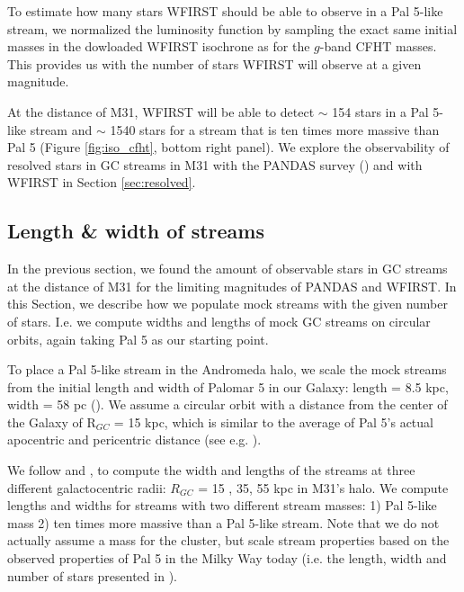 \documentclass[twocolumn]{aastex62}
\begin{document}
To estimate how many stars WFIRST should be able to observe in a Pal 5-like stream, we normalized the luminosity function by sampling the exact same initial masses in the dowloaded WFIRST isochrone as for the $g$-band CFHT masses. This provides us with the number of stars WFIRST will observe at a given magnitude. 

At the distance of M31, WFIRST will be able to detect $\sim$ 154 stars in a Pal 5-like stream and $\sim$ 1540 stars for a stream that is ten times more massive than Pal 5 (Figure \ref{fig:iso_cfht}, bottom right panel). We explore the observability of resolved stars in GC streams in M31 with the PANDAS survey (\citealt{mcconnachie09}) and with WFIRST in Section \ref{sec:resolved}. 




\subsection{Length \& width of streams}
\label{sec:length}
In the previous section, we found the amount of observable stars in GC streams at the distance of M31 for the limiting magnitudes of PANDAS and WFIRST. In this Section, we describe how we populate mock streams with the given number of stars. I.e. we compute widths and lengths of mock GC streams on circular orbits, again taking Pal 5 as our starting point. 

To place a Pal 5-like stream in the Andromeda halo, %
we scale the mock streams from the initial length and width of Palomar 5 in our Galaxy: length = 8.5 kpc, width = 58 pc (\citealt{ibata16}). We assume a circular orbit with a distance from the center of the Galaxy of R$_{GC}$ = 15 kpc, which is similar to the average of Pal 5's actual apocentric and pericentric distance (see e.g. \citealt{erkal17}). 

We follow \citet{johnston98} and \citet{johnston01}, to compute the width and lengths of the streams at three different galactocentric radii: $R_{GC}$ = 15 , 35, 55 kpc in M31's halo. We compute lengths and widths for streams with two different stream masses: 1) Pal 5-like mass 2) ten times more massive than a Pal 5-like stream. Note that we do not actually assume a mass for the cluster, but scale stream properties based on the observed properties of Pal 5 in the Milky Way today (i.e. the length, width and number of stars presented in \citealt{ibata16}).  
\end{document}
